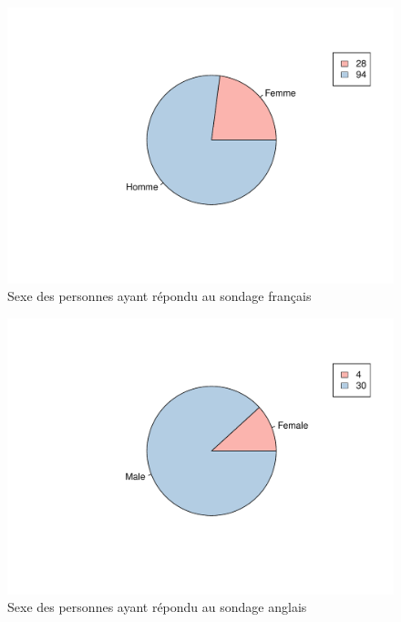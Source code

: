 \documentclass[12pt]{article}\usepackage[]{graphicx}\usepackage[]{color}
\makeatletter
\def\maxwidth{ %
  \ifdim\Gin@nat@width>\linewidth
    \linewidth
  \else
    \Gin@nat@width
  \fi
}
\newenvironment{knitrout}{}{} %
\makeatother
\begin{document}
\begin{knitrout}
\color{fgcolor}\begin{figure}[H]
\includegraphics[width=\maxwidth]{figure/sexe_fr-1} \caption[Sexe des personnes ayant répondu au sondage français]{Sexe des personnes ayant répondu au sondage français}\label{fig:sexe fr}
\end{figure}


\end{knitrout}

\begin{knitrout}
\color{fgcolor}\begin{figure}[H]
\includegraphics[width=\maxwidth]{figure/sexe_en-1} \caption[Sexe des personnes ayant répondu au sondage anglais]{Sexe des personnes ayant répondu au sondage anglais}\label{fig:sexe en}
\end{figure}


\end{knitrout}
\end{document}

